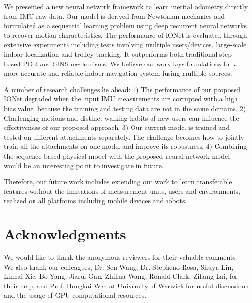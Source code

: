 \documentclass[letterpaper]{article}
\begin{document}
We presented a new neural network framework to learn inertial odometry directly from IMU raw data. Our model is derived from Newtonian mechanics and formulated as a sequential learning problem using deep recurrent neural networks to recover motion characteristics. The performance of IONet is evaluated through extensive experiments including tests involving multiple users/devices, large-scale indoor localization and trolley tracking. It outperforms both traditional step-based PDR and SINS mechanisms. We believe our work lays foundations for a more accurate and reliable indoor navigation system fusing multiple sources. 

A number of research challenges lie ahead: 1)  The performance of our proposed IONet degraded when the input IMU measurements are corrupted with a high bias value, because the training and testing data are not in the same domains. 2) Challenging motions and distinct walking habits of new users can influence the effectiveness of our proposed approach. 3) Our current model is trained and tested on different attachments separately. The challenge becomes how to jointly train all the attachments on one model and improve its robustness. 4) Combining the sequence-based physical model with the proposed neural network model would be an interesting point to investigate in future.

Therefore, our future work includes extending our work to learn transferable features without the limitations of measurement units, users and environments, realized on all platforms including mobile devices and robots. %

\section{ Acknowledgments}
We would like to thank the anonymous reviewers for their valuable comments. We also thank our colleagues, Dr. Sen Wang, Dr. Stepheno Rosa, Shuyu Lin, Linhai Xie, Bo Yang, Jiarui Gan, Zhihua Wang, Ronald Clark, Zihang Lai, for their help, and Prof. Hongkai Wen at University of Warwick for useful discussions and the usage of GPU computational resources.



\end{document}
